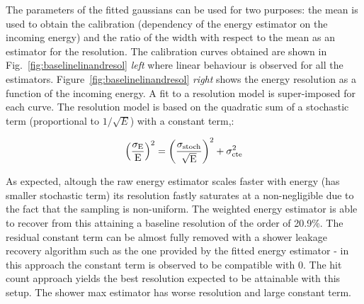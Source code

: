 The parameters of the fitted gaussians can be used for two purposes:
the mean is used to obtain the calibration (\ie dependency of the
energy estimator on the incoming energy) and the ratio of the width
with respect to the mean as an estimator for the resolution.
The calibration curves obtained are shown in Fig.~\ref{fig:baselinelinandresol}
{\em left} where linear behaviour is observed for all the estimators.
Figure~\ref{fig:baselinelinandresol} {\em right} shows the energy
resolution as a function of the incoming energy. 
A fit to a resolution model is super-imposed for each curve. The
resolution model is based on the quadratic sum of a stochastic term
(proportional to $1/\sqrt{E}$) with a constant term,\ie:

\begin{equation}
\left(\frac{\sigma_{\rm E}}{\rm E}\right)^2 = \left(\frac{\sigma_{\rm
      stoch}}{\sqrt{\rm E}}\right)^2+\sigma_{\rm cte}^2
\label{eq:resmodel}
\end{equation}

As expected, altough the raw energy estimator scales faster with
energy (\ie has smaller stochastic term) its resolution fastly
saturates at a non-negligible due to the fact that the sampling is
non-uniform. The weighted energy estimator is able to recover from
this attaining a baseline resolution of the order of 20.9\%. The
residual constant term can be almost fully removed with a shower
leakage recovery algorithm such as the one provided by the fitted
energy estimator - in this approach the constant term is observed to
be compatible with 0.
The hit count approach yields the best resolution expected to be
attainable with this setup. The shower max estimator has worse
resolution and large constant term.

